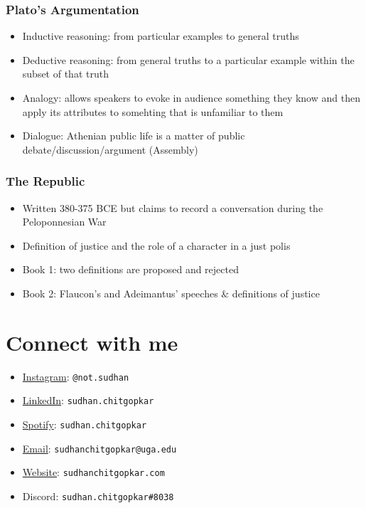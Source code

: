 \documentclass[11pt]{article}
\begin{document}
\subsubsection{Plato's Argumentation}
\label{sec:org1a6dbe8}
\begin{itemize}
\item Inductive reasoning: from particular examples to general truths
\item Deductive reasoning: from general truths to a particular example within the subset of that truth
\item Analogy: allows speakers to evoke in audience something they know and then apply its attributes
to somehting that is unfamiliar to them
\item Dialogue: Athenian public life is a matter of public debate/discussion/argument (Assembly)
\end{itemize}

\subsubsection{The Republic}
\label{sec:orgb636082}
\begin{itemize}
\item Written 380-375 BCE but claims to record a conversation during the Peloponnesian War
\item Definition of justice and the role of a character in a just polis
\item Book 1: two definitions are proposed and rejected
\item Book 2: Flaucon's and Adeimantus' speeches \& definitions of justice
\end{itemize}
\section{Connect with me}
\label{sec:org4069924}
\begin{itemize}
\item \href{http://instagram.sudhanchitgopkar.com}{Instagram}: \texttt{@not.sudhan}
\item \href{https://www.linkedin.com/in/sudhanchitgopkar/}{LinkedIn}: \texttt{sudhan.chitgopkar}
\item \href{http://spotify.sudhanchitgopkar.com}{Spotify}: \texttt{sudhan.chitgopkar}
\item \href{mailto:ssc10661@uga.edu}{Email}: \texttt{sudhanchitgopkar@uga.edu}
\item \href{http://sudhanchitgopkar.com}{Website}: \texttt{sudhanchitgopkar.com}
\item Discord: \texttt{sudhan.chitgopkar\#8038}
\end{itemize}
\end{document}
